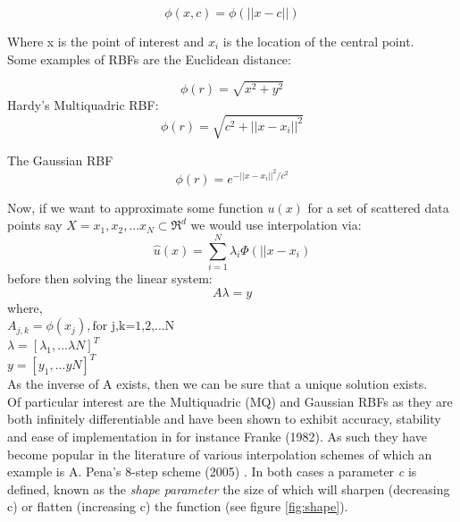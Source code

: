 \documentclass[a4paper]{amsart}
\begin{document}
\begin{equation}
\phi(x,c) = \phi(||x-c||)
\end{equation}

Where x is the point of interest and $x_{i}$ is the location of the central point. \\Some examples of RBFs are the Euclidean distance:

\begin{equation}
\phi(r) = \sqrt{x^{2} + y^{2}}
\end{equation}
Hardy's Multiquadric RBF:
\begin{equation}
\phi(r) = \sqrt{c^{2} + ||x-x_{i}||^{2}}
\end{equation}

The Gaussian RBF
\begin{equation}
\phi(r) = e^{-||x-x_{i}||^{2} / c^{2}}
\end{equation}

Now, if we want to approximate some function $u(x)$ for a set of scattered data points say $X={x_{1},x_{2},...x_{N}} \subset \Re^{d}$ we would use interpolation via:
\begin{equation}
\hat u(x) = \sum^{N}_{i=1} \lambda_{i} \Phi(||x - x_{i})
\label{RBFA}
\end{equation}
before then solving the linear system:
\begin{equation}
A\lambda =y
\end{equation}
where,
\\ $A_{j,k}= \phi(x_{j}), \mbox{for j,k=1,2,...N}$
\\$\lambda=[\lambda_{1},...\lambda{N}]^{T}$
\\$y=[y_{1},...y{N}]^{T}$\\

As the inverse of A exists, then we can be sure that a unique solution exists.\\

Of particular interest are the Multiquadric (MQ) and Gaussian RBFs as they are both infinitely differentiable and have been shown to exhibit accuracy, stability and ease of implementation in for instance Franke (1982)\cite{rbf3}. As such they have become popular in the literature of various interpolation schemes of which an example is A. Pena's 8-step scheme (2005) \cite{rbf6}. In both cases a parameter \emph{c} is defined, known as the \emph{shape parameter} the size of which will sharpen (decreasing c) or flatten (increasing c) the function (see figure \ref{fig:shape}).\\
\end{document}
